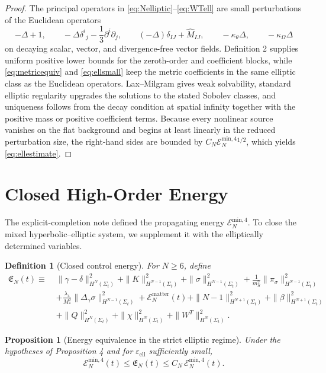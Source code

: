 \documentclass[11pt]{article}
\newtheorem{definition}{Definition}
\newtheorem{proposition}{Proposition}
\begin{document}
\begin{proof}
The principal operators in \eqref{eq:Nelliptic}--\eqref{eq:WTell} are small perturbations of the Euclidean operators
\[
-\Delta+1,\qquad
-\Delta\delta^i{}_j-\frac{1}{3}\partial^i\partial_j,\qquad
(-\Delta)\delta_{IJ}+\widehat M_{IJ},\qquad
-\kappa_\theta\Delta,\qquad
-\kappa_\Omega\Delta
\]
on decaying scalar, vector, and divergence-free vector fields. Definition 2 supplies uniform positive lower bounds for the zeroth-order and coefficient blocks, while \eqref{eq:metricequiv} and \eqref{eq:ellsmall} keep the metric coefficients in the same elliptic class as the Euclidean operators. Lax--Milgram gives weak solvability, standard elliptic regularity upgrades the solutions to the stated Sobolev classes, and uniqueness follows from the decay condition at spatial infinity together with the positive mass or positive coefficient terms. Because every nonlinear source vanishes on the flat background and begins at least linearly in the reduced perturbation size, the right-hand sides are bounded by \(C_N\mathcal E_N^{\mathrm{min},4}{}^{1/2}\), which yields \eqref{eq:ellestimate}.
\end{proof}

\section{Closed High-Order Energy}

The explicit-completion note defined the propagating energy \(\mathcal E_N^{\mathrm{min},4}\). To close the mixed hyperbolic--elliptic system, we supplement it with the elliptically determined variables.

\begin{definition}[Closed control energy]
For \(N\ge 6\), define
\begin{align}
\mathfrak E_N(t)
\equiv\;&
\|\gamma-\delta\|_{H^N(\Sigma_t)}^2
+\|K\|_{H^{N-1}(\Sigma_t)}^2
+\|\sigma\|_{H^{N-1}(\Sigma_t)}^2
+\frac{1}{m_S^2}\|\pi_\sigma\|_{H^{N-1}(\Sigma_t)}^2
\nonumber\\
&+\frac{\lambda_4}{M_*^2}\|\Delta_\gamma\sigma\|_{H^{N-1}(\Sigma_t)}^2
+\mathcal E_N^{\mathrm{matter}}(t)
+\|N-1\|_{H^{N+1}(\Sigma_t)}^2
+\|\beta\|_{H^{N+1}(\Sigma_t)}^2
\nonumber\\
&+\|Q\|_{H^N(\Sigma_t)}^2
+\|\chi\|_{H^N(\Sigma_t)}^2
+\|W^T\|_{H^N(\Sigma_t)}^2.
\label{eq:closedenergy}
\end{align}
\end{definition}

\begin{proposition}[Energy equivalence in the strict elliptic regime]
Under the hypotheses of Proposition 4 and for \(\varepsilon_{\mathrm{ell}}\) sufficiently small,
\begin{equation}
\mathcal E_N^{\mathrm{min},4}(t)
\le
\mathfrak E_N(t)
\le
C_N\,\mathcal E_N^{\mathrm{min},4}(t).
\label{eq:energyequiv}
\end{equation}
\end{proposition}
\end{document}
